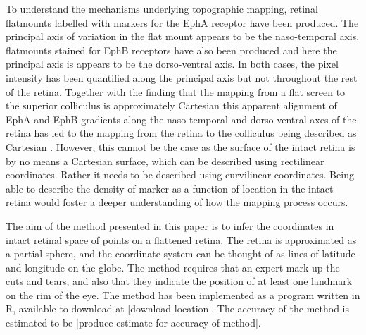 \documentclass[10pt]{article}
\newcommand{\todo}[1]{{\color{red}[#1]}}
\begin{document}
To understand the mechanisms underlying topographic mapping, retinal
flatmounts labelled with markers for the EphA receptor
\cite{ChenEtal95comp} have been produced. The principal axis of
variation in the flat mount appears to be the naso-temporal axis.
flatmounts stained for EphB receptors have also been produced
\cite{BirgEtal00kina} and here the principal axis is appears to be the
dorso-ventral axis. In both cases, the pixel intensity has been
quantified along the principal axis but not throughout the rest of the
retina.  Together with the finding that the mapping from a flat screen
to the superior colliculus is approximately Cartesian
\cite{DragHube76topo} this apparent alignment of EphA and EphB
gradients along the naso-temporal and dorso-ventral axes of the retina
has led to the mapping from the retina to the colliculus being
described as Cartesian \cite{BeviEtal11gene}. However, this cannot be
the case as the surface of the intact retina is by no means a
Cartesian surface, which can be described using rectilinear
coordinates.  Rather it needs to be described using curvilinear
coordinates. Being able to describe the density of marker as a
function of location in the intact retina would foster a deeper
understanding of how the mapping process occurs.


The aim of the method presented in this paper is to infer the
coordinates in intact retinal space of points on a flattened
retina. The retina is approximated as a partial sphere, and the
coordinate system can be thought of as lines of latitude and longitude
on the globe.  The method requires that an expert mark up the cuts and
tears, and also that they indicate the position of at least one
landmark on the rim of the eye. The method has been implemented as a
program written in R, available to download at \todo{download
  location}. The accuracy of the method is estimated to be
\todo{produce estimate for accuracy of method}.
\end{document}
